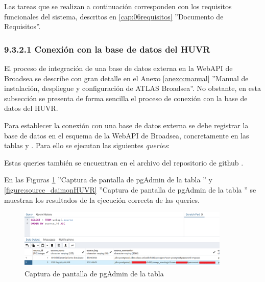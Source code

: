 Las tareas que se realizan a continuación corresponden con los requisitos funcionales del sistema, descritos en \ref{cap:06requisitos} ''Documento de Requisitos''.

\subsubsection{9.3.2.1 Conexión con la base de datos del HUVR}

El proceso de integración de una base de datos externa en la WebAPI de Broadsea se describe con gran detalle en el Anexo \ref{anexo:manual} ''Manual de instalación, despliegue y configuración de ATLAS Broadsea''. No obstante, en esta subsección se presenta de forma sencilla el proceso de conexión con la base de datos del HUVR.

Para establecer la conexión con una base de datos externa se debe registrar la base de datos en el esquema de la WebAPI de Broadsea, concretamente en las tablas  y . Para ello se ejecutan las siguientes \textit{queries}:




Estas queries también se encuentran en el archivo del repositorio de github . 

En las Figuras \ref{figure:sourceHUVR} ''Captura de pantalla de pgAdmin de la tabla '' y \ref{figure:source_daimonHUVR} ''Captura de pantalla de pgAdmin de la tabla '' se muestran los resultados de la ejecución correcta de las queries. 

\begin{figure}[H]
    \centering
    \includegraphics[width=0.90\textwidth]{figures/sourceHUVR.png}
    \caption{Captura de pantalla de pgAdmin de la tabla }
    \label{figure:sourceHUVR}
\end{figure}

